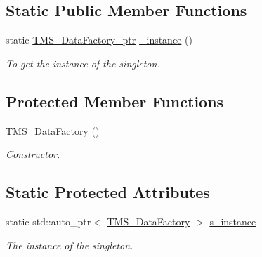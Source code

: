 \subsection*{Static Public Member Functions}
\begin{DoxyCompactItemize}
\item 
static \hyperlink{classTMS__Data_1_1TMS__DataFactory}{TMS\_\-DataFactory\_\-ptr} \hyperlink{classTMS__Data_1_1TMS__DataFactory_ae1af331902e12f84b55c7930c158eeaa}{\_\-instance} ()
\begin{DoxyCompactList}\small\item\em To get the instance of the singleton. \item\end{DoxyCompactList}\end{DoxyCompactItemize}
\subsection*{Protected Member Functions}
\begin{DoxyCompactItemize}
\item 
\hypertarget{classTMS__Data_1_1TMS__DataFactory_a9d28eca192f75f4a166b42f95d319bef}{
\hyperlink{classTMS__Data_1_1TMS__DataFactory_a9d28eca192f75f4a166b42f95d319bef}{TMS\_\-DataFactory} ()}
\label{classTMS__Data_1_1TMS__DataFactory_a9d28eca192f75f4a166b42f95d319bef}

\begin{DoxyCompactList}\small\item\em Constructor. \item\end{DoxyCompactList}\end{DoxyCompactItemize}
\subsection*{Static Protected Attributes}
\begin{DoxyCompactItemize}
\item 
\hypertarget{classTMS__Data_1_1TMS__DataFactory_a78e8c73d0ef09d09cb729815c1b1d6c2}{
static std::auto\_\-ptr$<$ \hyperlink{classTMS__Data_1_1TMS__DataFactory}{TMS\_\-DataFactory} $>$ \hyperlink{classTMS__Data_1_1TMS__DataFactory_a78e8c73d0ef09d09cb729815c1b1d6c2}{s\_\-instance}}
\label{classTMS__Data_1_1TMS__DataFactory_a78e8c73d0ef09d09cb729815c1b1d6c2}

\begin{DoxyCompactList}\small\item\em The instance of the singleton. \item\end{DoxyCompactList}\end{DoxyCompactItemize}


